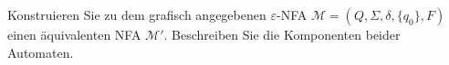 \begin{exercise}

Konstruieren Sie zu dem grafisch angegebenen $\varepsilon$-NFA  
$\mathcal{M} =(Q,\Sigma,\delta ,\{q_0\},F)$ einen äquivalenten NFA $\mathcal{M}'$. 
Beschreiben Sie die Komponenten beider Automaten.

\begin{center}
  
\end{center}

\end{exercise}

